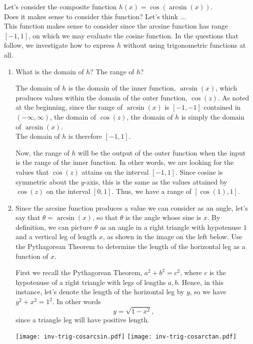 \documentclass{ximera}
\begin{document}
\begin{example}

Let's consider the composite function $h(x) = \cos(\arcsin(x))$.  \\
Does it makes sense to consider this function? Let's think $\dots$ \\
This function makes sense to consider since the arcsine function has range $[-1,1]$, on which we may evaluate the cosine function. In the questions that follow, we investigate how to express $h$ without using trigonometric functions at all.%
\par
%
\begin{enumerate}

\item What is the domain of $h$?  The range of $h$? \\
%
\begin{explanation}
The domain of $h$ is the domain of the inner function, $\arcsin(x)$, which produces values within the domain of the outer function, $\cos(z)$. As noted at the beginning, since the range of $\arcsin(x)$ is $[-1,-1]$ contained in $(-\infty,\infty)$, the domain of $\cos(z)$, the domain of $h$ is simply the domain of $\arcsin(x)$. \\
The domain of $h$ is therefore $[-1,1]$.

Now, the range of $h$ will be the output of the outer function when the input is the range of the inner function. In other words, we are looking for the values that $\cos(z)$ attains on the interval $[-1,1]$. Since cosine is symmetric about the $y$-axis, this is the same as the values attained by $\cos(z)$ on the interval $[0,1]$. Thus, we have a range of $[\cos(1),1]$.
\end{explanation}
%
\item Since the arcsine function produces a value we can consider as an angle, let's say that $\theta = \arcsin(x)$,  so that $\theta$ is the angle whose sine is $x$.  By definition, we can picture $\theta$ as an angle in a right triangle with hypotenuse $1$ and a vertical leg of length $x$, as shown in the image on the left below.  Use the Pythagorean Theorem to determine the length of the horizontal leg as a function of $x$. \\
%
\begin{explanation}
First we recall the Pythagorean Theorem, $a^2 +b^2 = c^2$, where $c$ is the hypotenuse of a right triangle with legs of lengths $a,b$. Hence, in this instance, let's denote the length of the horizontal leg by $y$, so we have $y^2 + x^2 = 1^2$. In other words
%
$$y = \sqrt{1-x^2},$$
%
since a triangle leg will have positive length.
\end{explanation}
%
\begin{image}
\texttt{[image: inv-trig-cosarcsin.pdf]}
\texttt{[image: inv-trig-cosarctan.pdf]}
\end{image}%



\end{enumerate}
\end{example}
\end{document}
